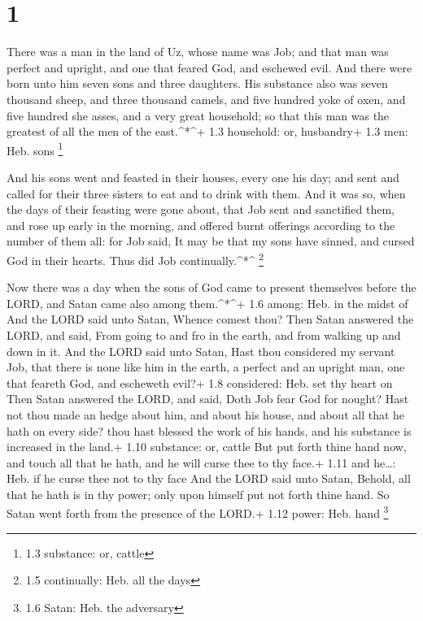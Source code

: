 \hypertarget{section}{%
\section{1}\label{section}}

 There was a man in the land of Uz, whose name was Job; and
that man was perfect and upright, and one that feared God, and eschewed
evil.  And there were born unto him seven sons and three
daughters.  His substance also was seven thousand sheep, and
three thousand camels, and five hundred yoke of oxen, and five hundred
she asses, and a very great household; so that this man was the greatest
of all the men of the east.\^{}*\^{}+ 1.3 household: or, husbandry+ 1.3
men: Heb. sons \footnote{1.3 substance: or, cattle}

 And his sons went and feasted in their houses, every one
his day; and sent and called for their three sisters to eat and to drink
with them.  And it was so, when the days of their feasting
were gone about, that Job sent and sanctified them, and rose up early in
the morning, and offered burnt offerings according to the number of them
all: for Job said, It may be that my sons have sinned, and cursed God in
their hearts. Thus did Job continually.\^{}*\^{} \footnote{1.5
  continually: Heb. all the days}

 Now there was a day when the sons of God came to present
themselves before the LORD, and Satan came also among them.\^{}*\^{}+
1.6 among: Heb. in the midst of  And the LORD said unto
Satan, Whence comest thou? Then Satan answered the LORD, and said, From
going to and fro in the earth, and from walking up and down in it.
 And the LORD said unto Satan, Hast thou considered my
servant Job, that there is none like him in the earth, a perfect and an
upright man, one that feareth God, and escheweth evil?+ 1.8 considered:
Heb. set thy heart on  Then Satan answered the LORD, and
said, Doth Job fear God for nought?  Hast not thou made an
hedge about him, and about his house, and about all that he hath on
every side? thou hast blessed the work of his hands, and his substance
is increased in the land.+ 1.10 substance: or, cattle  But
put forth thine hand now, and touch all that he hath, and he will curse
thee to thy face.+ 1.11 and he\ldots: Heb. if he curse thee not to thy
face  And the LORD said unto Satan, Behold, all that he
hath is in thy power; only upon himself put not forth thine hand. So
Satan went forth from the presence of the LORD.+ 1.12 power: Heb. hand
\footnote{1.6 Satan: Heb. the adversary}

